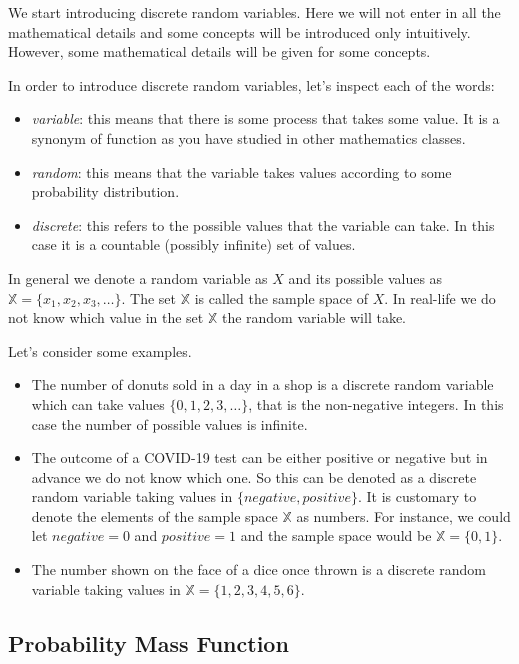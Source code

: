 \documentclass[
]{book}
\begin{document}
We start introducing discrete random variables. Here we will not enter in all the mathematical details and some concepts will be introduced only intuitively. However, some mathematical details will be given for some concepts.

In order to introduce discrete random variables, let's inspect each of the words:

\begin{itemize}
\item
  \emph{variable}: this means that there is some process that takes some value. It is a synonym of function as you have studied in other mathematics classes.
\item
  \emph{random}: this means that the variable takes values according to some probability distribution.
\item
  \emph{discrete}: this refers to the possible values that the variable can take. In this case it is a countable (possibly infinite) set of values.
\end{itemize}

In general we denote a random variable as \(X\) and its possible values as \(\mathbb{X}=\{x_1,x_2,x_3,\dots\}\). The set \(\mathbb{X}\) is called the sample space of \(X\). In real-life we do not know which value in the set \(\mathbb{X}\) the random variable will take.

Let's consider some examples.

\begin{itemize}
\item
  The number of donuts sold in a day in a shop is a discrete random variable which can take values \(\{0,1,2,3,\dots\}\), that is the non-negative integers. In this case the number of possible values is infinite.
\item
  The outcome of a COVID-19 test can be either positive or negative but in advance we do not know which one. So this can be denoted as a discrete random variable taking values in \(\{negative,positive\}\). It is customary to denote the elements of the sample space \(\mathbb{X}\) as numbers. For instance, we could let \(negative = 0\) and \(positive = 1\) and the sample space would be \(\mathbb{X}=\{0,1\}\).
\item
  The number shown on the face of a dice once thrown is a discrete random variable taking values in \(\mathbb{X}=\{1,2,3,4,5,6\}\).
\end{itemize}

\hypertarget{probability-mass-function}{%
\subsection{Probability Mass Function}\label{probability-mass-function}}
\end{document}
